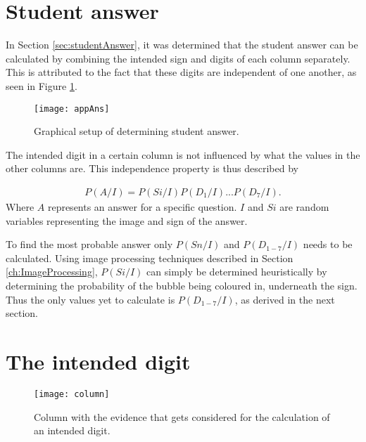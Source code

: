 \section{Student answer}

In Section \ref{sec:studentAnswer}, it was determined that the student answer can be calculated by combining the intended sign and digits of each column separately. This is attributed to the fact that these digits are independent of one another, as seen in Figure \ref{fig:appAns}. 

\begin{figure}
  \centering
  \texttt{[image: appAns]}\\
  \caption{Graphical setup of determining student answer.}
  \label{fig:appAns}
\end{figure}

The intended digit in a certain column is not influenced by what the values in the other columns are. This independence property is thus described by

\begin{align}
  P(A/I) =  P(Si/I)P(D_1/I)...P(D_7/I).
\label{eqn:ansIndep}
\end{align}
Where $A$ represents an answer for a specific question. $I$ and $Si$ are random variables representing the image and sign of the answer.

To find the most probable answer only $P(Sn/I)$ and $P(D_{1-7}/I)$ needs to be calculated. Using image processing techniques described in Section \ref{ch:ImageProcessing}, $P(Si/I)$ can simply be determined heuristically by determining the probability of the bubble being coloured in, underneath the sign. Thus the only values yet to calculate is $P(D_{1-7}/I)$, as derived in the next section.

\section{The intended digit}

\begin{figure}
  \centering
  \texttt{[image: column]}\\
  \caption{Column with the evidence that gets considered for the calculation of an intended digit.}
  \label{fig:column}
\end{figure}

